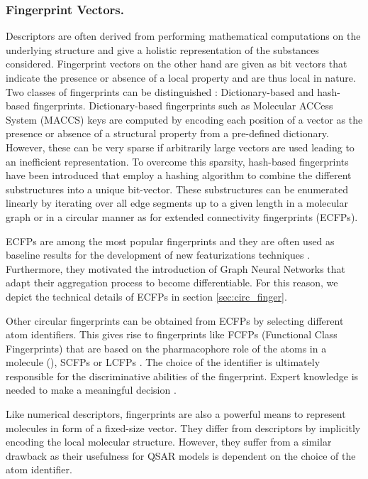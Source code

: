 \subsubsection*{Fingerprint Vectors.}
Descriptors are often derived from performing mathematical computations on the underlying structure and give a holistic representation of the substances considered. Fingerprint vectors on the other hand are given as bit vectors that indicate the presence or absence of a local property and are thus local in nature. Two classes of fingerprints can be distinguished \citep{SHEN201929}: Dictionary-based and hash-based fingerprints. Dictionary-based fingerprints such as Molecular ACCess System (MACCS) keys \citep{durant2002reoptimization} are computed by encoding each position of a vector as the presence or absence of a structural property from a pre-defined dictionary. However, these can be very sparse if arbitrarily large vectors are used leading to an inefficient representation. To overcome this sparsity, hash-based fingerprints have been introduced that employ a hashing algorithm to combine the different substructures into a unique bit-vector. These substructures can be enumerated linearly by iterating over all edge segments up to a given length in a molecular graph \citep{daylight} or in a circular manner as for extended connectivity fingerprints (ECFPs). 

ECFPs \citep{ECFP} are among the most popular fingerprints and they are often used as baseline results for the development of new featurizations techniques \citep{li2017learning, wu2018moleculenet, STOKES2020688}. Furthermore, they motivated the introduction of Graph Neural Networks that adapt their aggregation process to become differentiable. For this reason, we depict the technical details of ECFPs in section \ref{sec:circ_finger}.

Other circular fingerprints can be obtained from ECFPs by selecting different atom identifiers. This gives rise to fingerprints like FCFPs (Functional Class Fingerprints) that are based on the pharmacophore role of the atoms in a molecule (\cite{ECFP}), SCFPs \citep{SCFP} or LCFPs \citep{LCFP}. The choice of the identifier is ultimately responsible for the discriminative abilities of the fingerprint. Expert knowledge is needed to make a meaningful decision \citep{WIEDER2020}.

Like numerical descriptors, fingerprints are also a powerful means to represent molecules in form of a fixed-size vector. They differ from descriptors by implicitly encoding the local molecular structure. However, they suffer from a similar drawback as their usefulness for QSAR models is dependent on the choice of the atom identifier.

